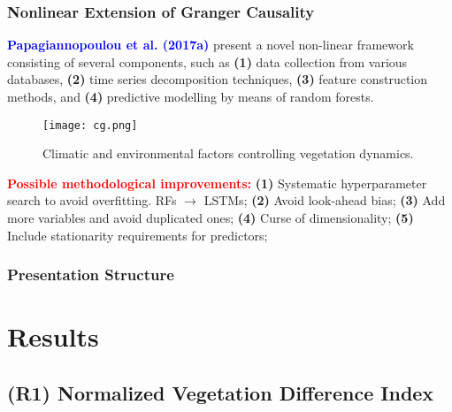 \documentclass[11pt]{beamer}
\newcommand{\citat}[2]{\textbf{\textcolor{blue}{#1 et al. (#2)}}}
\begin{document}
\begin{frame}
  \frametitle{\normalsize{\textbf{
        Nonlinear Extension of Granger Causality
  }}}

  \scriptsize{

    \vspace{0.20cm}
    
    \textbullet \: \citat{Papagiannopoulou}{2017a} present a novel non-linear framework
      consisting of several components, such as \textbf{(1)} data collection
      from various databases, \textbf{(2)} time series decomposition techniques,
      \textbf{(3)} feature construction methods, and \textbf{(4)} predictive
      modelling by means of random forests.
 
    \begin{figure}[h!]
      \centering
      \texttt{[image: cg.png]}
      \caption*{\scriptsize{
          Climatic and environmental factors controlling vegetation dynamics.
      }}
      \end{figure}

    \textbullet \: \textbf{\textcolor{red}{Possible methodological
        improvements:}} \textbf{(1)} Systematic hyperparameter search to avoid
    overfitting. RFs $\rightarrow$ LSTMs; \textbf{(2)} Avoid look-ahead bias;
    \textbf{(3)} Add more variables and avoid duplicated ones; \textbf{(4)}
    Curse of dimensionality; \textbf{(5)} Include stationarity requirements for
    predictors;
    
  }
  
\end{frame}

\begin{frame}
  \frametitle{\normalsize{\textbf{
        Presentation Structure
  }}}

  \section{Results}
  \tableofcontents[currentsection] 
  
\end{frame}

\subsection{(R1) Normalized Vegetation Difference Index}
\end{document}
